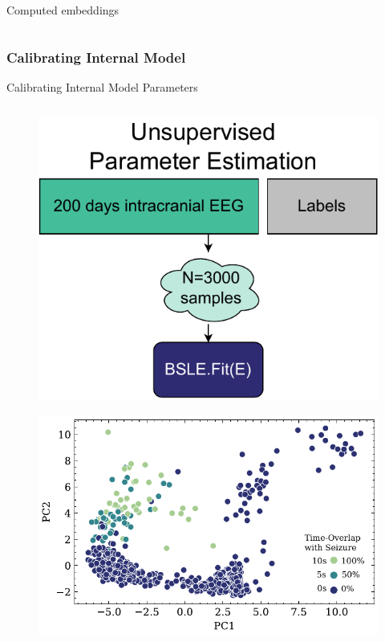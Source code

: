 \documentclass[t]{beamer}
\theoremstyle{definition}
\def\baselineskip{}%
\begin{document}
\begin{frame}{Computed embeddings}
\begin{columns}
    \end{columns}

\end{frame}


\subsubsection{Calibrating Internal Model}

\begin{frame}{Calibrating Internal Model Parameters}
\begin{columns}[T]
    \begin{column}{0.382\textwidth}
        \begin{figure}
            \centering
            \includegraphics[width=\textwidth]{figs/model_calibration.pdf}
            \label{fig:my_label}
        \end{figure}
        \vspace{-1.5\baselineskip}
        \begin{figure}
            \centering
            \includegraphics[width=\textwidth]{figs/embeddings_double.pdf}

\end{figure}
\end{column}
\end{columns}
\end{frame}
\end{document}
